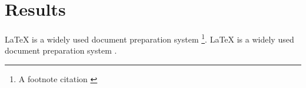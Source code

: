 \renewcommand*\chapterpagestyle{scrheadings}
\chapter{Results} \setAuthor{}
LaTeX is a widely used document preparation system \footnote{A footnote citation \cite{wiki:latex}}.
\newline
LaTeX is a widely used document preparation system \cite{wiki:latex}.

